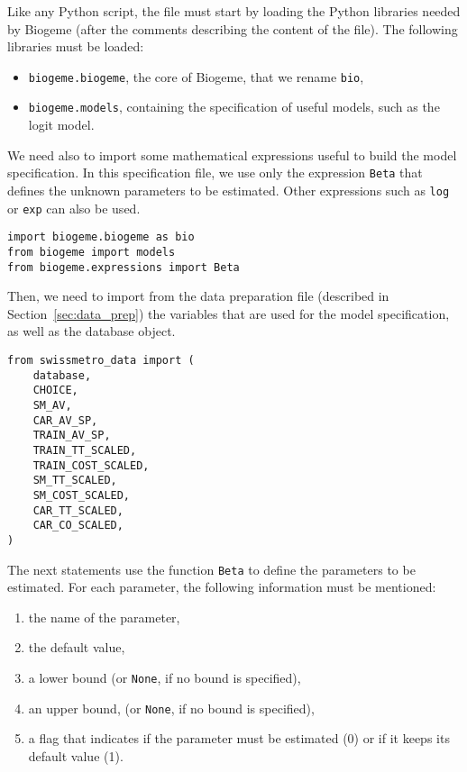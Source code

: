 \documentclass[12pt,a4paper]{article}
\begin{document}
Like any Python script, the  file must start by loading the Python libraries
needed by Biogeme (after the comments describing the content of the file). The following libraries must be loaded:

\begin{itemize}
\item \lstinline+biogeme.biogeme+, the core of Biogeme, that we rename \lstinline+bio+,
\item \lstinline+biogeme.models+, containing the specification of useful models, such as the logit model.
\end{itemize}

We need also to import some mathematical expressions useful to build
the model specification. In this specification file, we use only the expression
\lstinline+Beta+ that defines the unknown parameters to be estimated. Other expressions such as \lstinline+log+ or \lstinline+exp+ can also be used. 

\begin{lstlisting}[style=nonumbers]
import biogeme.biogeme as bio
from biogeme import models
from biogeme.expressions import Beta
\end{lstlisting}


Then, we need to import from the data preparation file (described in Section~\ref{sec:data_prep}) the variables that are used for the model specification, as well as the database object.

\begin{lstlisting}[style=nonumbers]
from swissmetro_data import (
    database,
    CHOICE,
    SM_AV,
    CAR_AV_SP,
    TRAIN_AV_SP,
    TRAIN_TT_SCALED,
    TRAIN_COST_SCALED,
    SM_TT_SCALED,
    SM_COST_SCALED,
    CAR_TT_SCALED,
    CAR_CO_SCALED,
)
\end{lstlisting}


The next statements use the function \lstinline+Beta+ to define the parameters to be estimated. For each parameter, the following information must be mentioned:
\begin{enumerate}
\item the name of the parameter,
\item the default value,
\item a lower bound (or \lstinline+None+, if no bound is specified),
\item an upper bound, (or \lstinline+None+, if no bound is specified),
\item a flag that indicates if the parameter must be estimated (0) or
  if it keeps its default value (1).
\end{enumerate}
\end{document}

